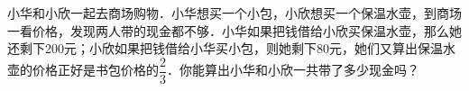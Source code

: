 小华和小欣一起去商场购物．小华想买一个小包，小欣想买一个保温水壶，到商场一看价格，发现两人带的现金都不够．小华如果把钱借给小欣买保温水壶，那么她还剩下200元；小欣如果把钱借给小华买小包，则她剩下80元，她们又算出保温水壶的价格正好是书包价格的$\dfrac{2}{3}$．你能算出小华和小欣一共带了多少现金吗？